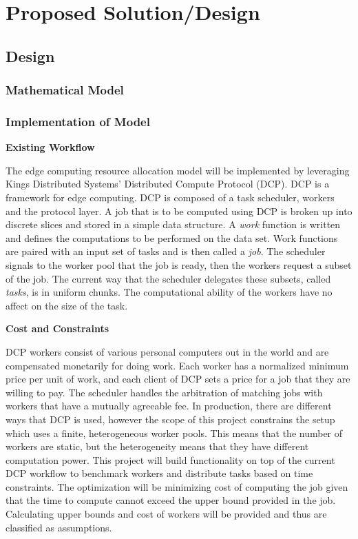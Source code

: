 \documentclass[../mthe-493-project-proposal.tex]{subfiles}
\begin{document}
    \chapter{Proposed Solution/Design}
    \label{ch:proposed-design}
    \blindtext

    \section{Design}
    \blindtext
    
    \subsection{Mathematical Model}
    \blindtext

    \subsection{Implementation of Model}
    \textbf{Existing Workflow}
    
    The edge computing resource allocation model will be implemented by leveraging  Kings Distributed Systems' Distributed Compute Protocol (DCP). DCP is a framework for edge computing. DCP is composed of a task scheduler, workers and the protocol layer. A job that is to be computed using DCP is broken up into discrete slices and stored in a simple data structure. A \emph{work} function is written and defines the computations to be performed on the data set. Work functions are paired with an input set of tasks and is then called a \emph{job}. The scheduler signals to the worker pool that the job is ready, then the workers request a subset of the job. The current way that the scheduler delegates these subsets, called \emph{tasks}, is in uniform chunks. The computational ability of the workers have no affect on the size of the task.
    
    \textbf{Cost and Constraints}
    
    DCP workers consist of various personal computers out in the world and are compensated monetarily for doing work. Each worker has a normalized minimum price per unit of work, and each client of DCP sets a price for a job that they are willing to pay. The scheduler handles the arbitration of matching jobs with workers that have a mutually agreeable fee. In production, there are different ways that DCP is used, however the scope of this project constrains the setup which uses a finite, heterogeneous worker pools. This means that the number of workers are static, but the heterogeneity means that they have different computation power. This project will build functionality on top of the current DCP workflow to benchmark workers and distribute tasks based on time constraints. The optimization will be minimizing cost of computing the job given that the time to compute cannot exceed the upper bound provided in the job. Calculating upper bounds and cost of workers will be provided and thus are classified as assumptions. 
    
\end{document}
